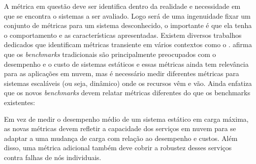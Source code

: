 A métrica em questão deve ser identifica dentro da realidade e necessidade em que se encontra o sistemas a ser avaliado. Logo será de uma ingenuidade fixar um conjunto de métricas para um sistema desconhecido, o importante é que ela tenha o comportamento e as características apresentadas. Existem diversos trabalhos dedicados que identificam métricas transiente em vários contextos como o \cite{Binnig2009, Lu2000, Rosu1997}.
\cite{Binnig2009} afirma que os \textit{benchmarks} tradicionais são principalmente preocupados com o desempenho e o custo de sistemas estáticos e essas métricas ainda tem relevância para as aplicações em nuvem, mas é necessário medir diferentes métricas para sistemas escaláveis (ou seja, dinâmico) onde os recursos vêm e vão. Ainda \cite{Binnig2009} enfatiza que os novos \textit{benchmarks} devem relatar métricas diferentes do que os benchmarks existentes: 
\begin{citacao}
	Em vez de medir o desempenho médio de um sistema estático em carga máxima, as novas métricas devem refletir a capacidade dos serviços em nuvem para se adaptar a uma mudança de carga com relação ao desempenho e custos. Além disso, uma métrica adicional também deve cobrir a robustez desses serviços contra falhas de nós individuais.
\end{citacao}

